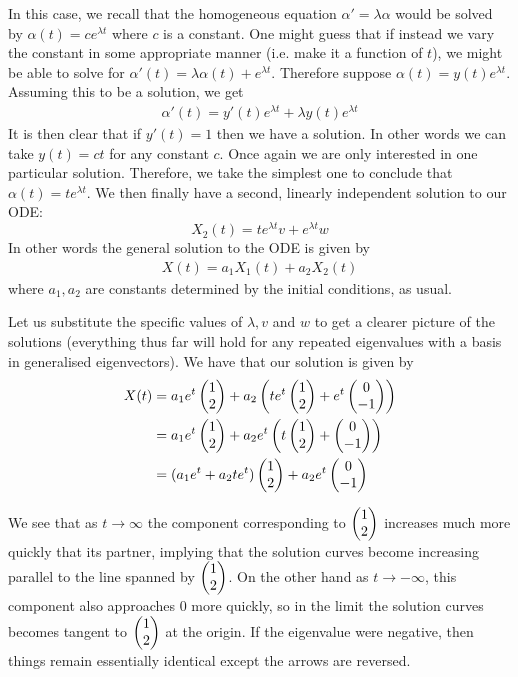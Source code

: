 In this case, we recall that the homogeneous equation $\alpha' = \lambda \alpha$ would be solved by $\alpha(t) = c e^{\lambda t}$ where $c$ is a constant. One might guess that if instead we vary the constant in some appropriate manner (i.e. make it a function of $t$), we might be able to solve for $\alpha'(t) = \lambda \alpha(t) + e^{\lambda t}$. Therefore suppose $\alpha(t) = y(t) e^{\lambda t}$. Assuming this to be a solution, we get
\begin{align*}
    \alpha'(t) = y'(t) e^{\lambda t} + \lambda y(t) e^{\lambda t}
\end{align*}
It is then clear that if $y'(t) = 1$ then we have a solution. In other words we can take $y(t) = ct$ for any constant $c$. Once again we are only interested in one particular solution. Therefore, we take the simplest one to conclude that $\alpha(t) = te^{\lambda t}$. We then finally have a second, linearly independent solution to our ODE:
$$ X_2(t) = te^{\lambda t} v + e^{\lambda t}w $$
In other words the general solution to the ODE is given by
\begin{align*}
    X(t) = a_1 X_1(t) + a_2 X_2(t)
\end{align*}
where $a_1, a_2$ are constants determined by the initial conditions, as usual.

Let us substitute the specific values of $\lambda, v$ and $w$ to get a clearer picture of the solutions (everything thus far will hold for any repeated eigenvalues with a basis in generalised eigenvectors). We have that our solution is given by
\begin{align*}
    X(t) &= a_1 e^{t} \begin{pmatrix} 1\\2 \end{pmatrix} + a_2 \left( t e^{t} \begin{pmatrix} 1\\2 \end{pmatrix} + e^{t} \begin{pmatrix} 0\\-1 \end{pmatrix} \right)\\
    &= a_1 e^{t} \begin{pmatrix} 1\\2 \end{pmatrix} + a_2 e^{t} \left( t \begin{pmatrix} 1\\2 \end{pmatrix} + \begin{pmatrix} 0\\-1 \end{pmatrix}  \right)\\
    &= (a_1 e^{t} + a_2 t e^{t}) \begin{pmatrix} 1\\2 \end{pmatrix} + a_2 e^{t} \begin{pmatrix} 0\\-1 \end{pmatrix}
\end{align*}

We see that as $t \to \infty$ the component corresponding to $\begin{pmatrix} 1\\2 \end{pmatrix}$ increases much more quickly that its partner, implying that the solution curves become increasing parallel to the line spanned by $\begin{pmatrix} 1\\2 \end{pmatrix}$. On the other hand as $t \to -\infty$, this component also approaches 0 more quickly, so in the limit the solution curves becomes tangent to $\begin{pmatrix} 1\\2 \end{pmatrix}$ at the origin. If the eigenvalue were negative, then things remain essentially identical except the arrows are reversed.

